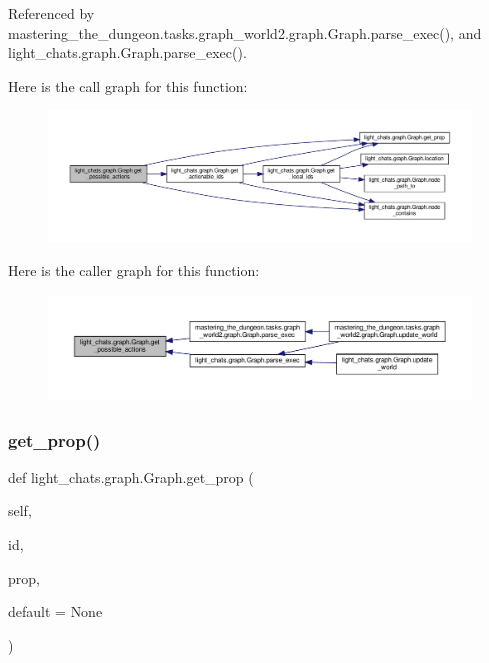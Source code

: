 Referenced by mastering\+\_\+the\+\_\+dungeon.\+tasks.\+graph\+\_\+world2.\+graph.\+Graph.\+parse\+\_\+exec(), and light\+\_\+chats.\+graph.\+Graph.\+parse\+\_\+exec().

Here is the call graph for this function\+:
\nopagebreak
\begin{figure}[H]
\begin{center}
\leavevmode
\includegraphics[width=350pt]{classlight__chats_1_1graph_1_1Graph_a40e6753f63c9c8d31dd57a5c38aaac3c_cgraph}
\end{center}
\end{figure}
Here is the caller graph for this function\+:
\nopagebreak
\begin{figure}[H]
\begin{center}
\leavevmode
\includegraphics[width=350pt]{classlight__chats_1_1graph_1_1Graph_a40e6753f63c9c8d31dd57a5c38aaac3c_icgraph}
\end{center}
\end{figure}
\mbox{\label{classlight__chats_1_1graph_1_1Graph_a30483d3bbb88924bb7b98fb72b2e23fe}} 
\subsubsection{\texorpdfstring{get\+\_\+prop()}{get\_prop()}}
{\footnotesize\ttfamily def light\+\_\+chats.\+graph.\+Graph.\+get\+\_\+prop (\begin{DoxyParamCaption}\item[{}]{self,  }\item[{}]{id,  }\item[{}]{prop,  }\item[{}]{default = {\ttfamily None} }\end{DoxyParamCaption})}

